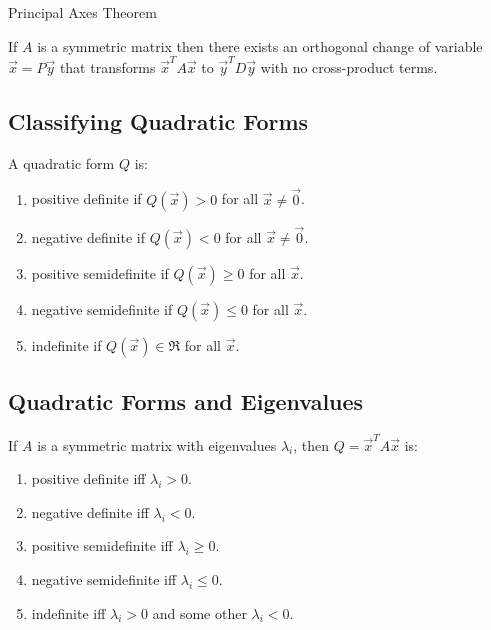 \begin{theorem} Principal Axes Theorem

    If \(A\) is a symmetric matrix then there exists an orthogonal change of variable \(\Vec{x}=P\Vec{y}\) that transforms \(\Vec{x}^T A \Vec{x}\) to \(\Vec{y}^T D \Vec{y}\) with no cross-product terms.
\end{theorem}

\subsection{Classifying Quadratic Forms}
\begin{definition}
    A quadratic form \(Q\) is:
    \begin{enumerate}
        \item positive definite if \(Q(\Vec{x}) > 0\) for all \(\Vec{x}\ne\Vec{0}\).
        \item negative definite if \(Q(\Vec{x}) < 0\) for all \(\Vec{x}\ne\Vec{0}\).
        \item positive semidefinite if \(Q(\Vec{x}) \ge 0\) for all \(\Vec{x}\).
        \item negative semidefinite if \(Q(\Vec{x}) \le 0\) for all \(\Vec{x}\).
        \item indefinite if \(Q(\Vec{x}) \in \Re\) for all \(\Vec{x}\).
    \end{enumerate}
\end{definition}

\subsection{Quadratic Forms and Eigenvalues}
\begin{theorem}
    If \(A\) is a symmetric matrix with eigenvalues \(\lambda_i\), then \(Q = \Vec{x}^T A \Vec{x}\) is:
    \begin{enumerate}
        \item positive definite iff \(\lambda_i > 0\).
        \item negative definite iff \(\lambda_i < 0\).
        \item positive semidefinite iff \(\lambda_i \ge 0\).
        \item negative semidefinite iff \(\lambda_i \le 0\).
        \item indefinite iff \(\lambda_i > 0\) and some other \(\lambda_i < 0\).
    \end{enumerate}
\end{theorem}